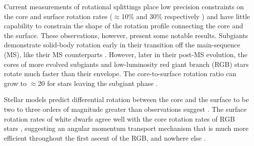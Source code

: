Current measurements of rotational splittings place low precision constraints on the core and surface rotation rates ($\approx$10\% and 30\% respectively ) and have little capability to constrain the shape of the rotation profile connecting the core and the surface. These observations, however, present some notable results.
Subgiants demonstrate solid-body rotation early in their transition off the main-sequence (MS), like their MS counterparts \citep{deheuvels_seismic_2020,noll_probing_2021}. However, later in their post-MS evolution, the cores of more evolved subgiants and low-luminosity red giant branch (RGB) stars rotate much faster than their envelope. The core-to-surface rotation ratio can grow to $\approx$20 for stars leaving the subgiant phase \citep{deheuvels_seismic_2014, gehan_core_2018, eggenberger_asteroseismology_2019}.

Stellar models predict differential rotation between the core and the surface to be two to three orders of magnitude greater than observations suggest \citep{eggenberger_angular_2012, cantiello_angular_2014}. The surface rotation rates of white dwarfs agree well with the core rotation rates of RGB stars \citep{gough_glimpses_2015,hermes_deep_2017}, suggesting an angular momentum transport mechanism that is much more efficient throughout the first ascent of the RGB, and nowhere else \citep{eggenberger_angular_2012,marques_seismic_2013,ceillier_understanding_2013, fuller_asteroseismology_2015,spada_angular_2016,ouazzani_gamma_2018}.



